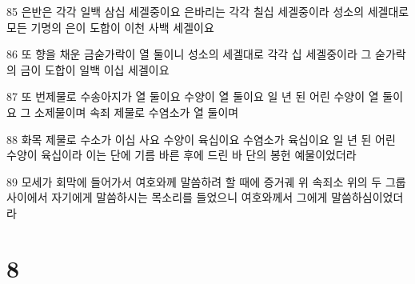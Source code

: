 \par 85 은반은 각각 일백 삼십 세겔중이요 은바리는 각각 칠십 세겔중이라 성소의 세겔대로 모든 기명의 은이 도합이 이천 사백 세겔이요
\par 86 또 향을 채운 금숟가락이 열 둘이니 성소의 세겔대로 각각 십 세겔중이라 그 숟가락의 금이 도합이 일백 이십 세겔이요
\par 87 또 번제물로 수송아지가 열 둘이요 수양이 열 둘이요 일 년 된 어린 수양이 열 둘이요 그 소제물이며 속죄 제물로 수염소가 열 둘이며
\par 88 화목 제물로 수소가 이십 사요 수양이 육십이요 수염소가 육십이요 일 년 된 어린 수양이 육십이라 이는 단에 기름 바른 후에 드린 바 단의 봉헌 예물이었더라
\par 89 모세가 회막에 들어가서 여호와께 말씀하려 할 때에 증거궤 위 속죄소 위의 두 그룹 사이에서 자기에게 말씀하시는 목소리를 들었으니 여호와께서 그에게 말씀하심이었더라

\chapter{8}

